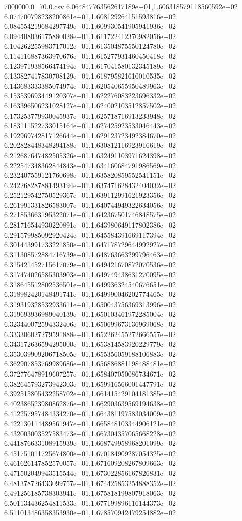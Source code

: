 \begin{filecontents*}{7000000.0_70.0.csv}
6.064847763562617189e+01,1.606318579118560592e+02
6.074700798238200861e+01,1.608129264151593816e+02
6.084554219684297749e+01,1.609930541905941936e+02
6.094408036175880028e+01,1.611722412370982056e+02
6.104262255983717012e+01,1.613504875550124780e+02
6.114116887363970676e+01,1.615277931460450418e+02
6.123971938566474194e+01,1.617041580132345189e+02
6.133827417830708129e+01,1.618795821610010535e+02
6.143683333385074974e+01,1.620540655950489963e+02
6.153539693449120307e+01,1.622276083223696332e+02
6.163396506231028127e+01,1.624002103512857502e+02
6.173253779930045937e+01,1.625718716913233948e+02
6.183111522733015164e+01,1.627425923533046443e+02
6.192969742817126644e+01,1.629123723492384670e+02
6.202828448348294188e+01,1.630812116923916619e+02
6.212687647482505326e+01,1.632491103971624398e+02
6.222547348362844843e+01,1.634160684791986569e+02
6.232407559121760698e+01,1.635820859552541151e+02
6.242268287881493194e+01,1.637471628432404032e+02
6.252129542750529367e+01,1.639112991621923356e+02
6.261991331826583007e+01,1.640744949322634056e+02
6.271853663195322071e+01,1.642367501746848575e+02
6.281716544930220891e+01,1.643980649117802386e+02
6.291579985092920424e+01,1.645584391669117394e+02
6.301443991733221850e+01,1.647178729644992927e+02
6.311308572884716739e+01,1.648763663299796463e+02
6.315421452715617079e+01,1.649421670872070536e+02
6.317474026585303903e+01,1.649749438631270095e+02
6.318645512802536501e+01,1.649936324540676651e+02
6.318982420148491741e+01,1.649990046202774465e+02
6.319319328532933611e+01,1.650043756369313996e+02
6.319693936989040139e+01,1.650103461972285004e+02
6.323440072594332406e+01,1.650699673136969068e+02
6.333306027279591888e+01,1.652262455272666557e+02
6.343172636594295000e+01,1.653814583920229779e+02
6.353039909206718505e+01,1.655356059188106883e+02
6.362907853769989686e+01,1.656886881198488481e+02
6.372776478919607257e+01,1.658407050086734671e+02
6.382645793273942303e+01,1.659916566001447791e+02
6.392515805432258702e+01,1.661415429104181385e+02
6.402386523980862876e+01,1.662903639569194638e+02
6.412257957484334270e+01,1.664381197583034009e+02
6.422130114489561947e+01,1.665848103344906121e+02
6.432003003527583473e+01,1.667304357065668228e+02
6.441876633108915939e+01,1.668749958968201099e+02
6.451751011725674800e+01,1.670184909287054325e+02
6.461626147852570057e+01,1.671609208267809663e+02
6.471502049943515544e+01,1.673022856167826831e+02
6.481378726433099757e+01,1.674425853254888352e+02
6.491256185738303941e+01,1.675818199807918063e+02
6.501134436254811533e+01,1.677199896116144373e+02
6.511013486358353930e+01,1.678570942479254882e+02

\end{filecontents*}

